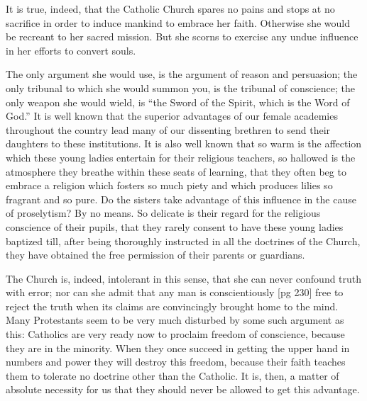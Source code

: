 It is true, indeed, that the Catholic Church
spares no pains and stops at no sacrifice in order
to induce mankind to embrace her faith. Otherwise
she would be recreant to her sacred mission.
But she scorns to exercise any undue influence in
her efforts to convert souls.

The only argument she would use, is the argument
of reason and persuasion; the only tribunal
to which she would summon you, is the tribunal of
conscience; the only weapon she would wield, is
“the Sword of the Spirit, which is the Word of
God.” It is well known that the superior advantages
of our female academies throughout the country
lead many of our dissenting brethren to send
their daughters to these institutions. It is also
well known that so warm is the affection which
these young ladies entertain for their religious
teachers, so hallowed is the atmosphere they
breathe within these seats of learning, that they
often beg to embrace a religion which fosters so
much piety and which produces lilies so fragrant
and so pure. Do the sisters take advantage of
this influence in the cause of proselytism? By no
means. So delicate is their regard for the religious
conscience of their pupils, that they rarely
consent to have these young ladies baptized till,
after being thoroughly instructed in all the doctrines
of the Church, they have obtained the free
permission of their parents or guardians.

The Church is, indeed, intolerant in this sense,
that she can never confound truth with error; nor
can she admit that any man is conscientiously
[pg 230]
free to reject the truth when its claims are convincingly
brought home to the mind. Many Protestants
seem to be very much disturbed by some
such argument as this: Catholics are very ready
now to proclaim freedom of conscience, because
they are in the minority. When they once succeed
in getting the upper hand in numbers and
power they will destroy this freedom, because
their faith teaches them to tolerate no doctrine
other than the Catholic. It is, then, a matter of
absolute necessity for us that they should never
be allowed to get this advantage.

